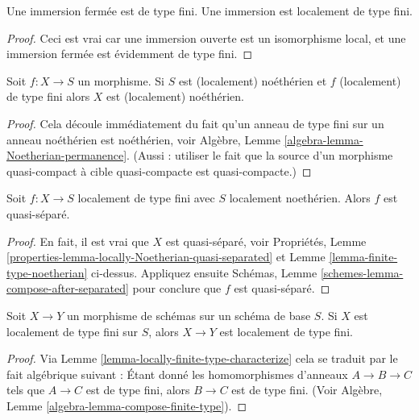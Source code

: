 \begin{lemma}
\label{lemma-immersion-locally-finite-type}
Une immersion fermée est de type fini. Une
immersion est localement de type fini.
\end{lemma}

\begin{proof}
Ceci est vrai car une immersion ouverte est un isomorphisme local,
et une immersion fermée est évidemment de type fini.
\end{proof}

\begin{lemma}
\label{lemma-finite-type-noetherian}
Soit $f : X \to S$ un morphisme. Si $S$
est (localement) noéthérien et $f$ (localement) de type fini alors
$X$ est (localement) noéthérien.
\end{lemma}

\begin{proof}
Cela découle immédiatement du fait qu'un anneau
de type fini sur un anneau noéthérien est noéthérien,
voir Algèbre, Lemme \ref{algebra-lemma-Noetherian-permanence}. (Aussi : utiliser
le fait que la source d'un morphisme quasi-compact à cible
quasi-compacte est quasi-compacte.)
\end{proof}

\begin{lemma}
\label{lemma-finite-type-Noetherian-quasi-separated}
Soit $f : X \to S$ localement de type fini avec $S$ localement noethérien. Alors
$f$ est quasi-séparé.
\end{lemma}

\begin{proof}
En fait, il est vrai que $X$ est
quasi-séparé, voir Propriétés, Lemme \ref{properties-lemma-locally-Noetherian-quasi-separated} et Lemme
\ref{lemma-finite-type-noetherian} ci-dessus. Appliquez ensuite
Schémas, Lemme \ref{schemes-lemma-compose-after-separated} pour conclure que
$f$ est quasi-séparé.
\end{proof}

\begin{lemma}
\label{lemma-permanence-finite-type}
Soit $X \to Y$ un morphisme de schémas sur un schéma de base $S$. Si
$X$ est localement de type fini sur $S$, alors $X \to Y$
est localement de type fini.
\end{lemma}

\begin{proof}
Via Lemme \ref{lemma-locally-finite-type-characterize} cela se traduit par le fait algébrique suivant
: Étant donné les
homomorphismes d'anneaux $A \to B \to C$ tels que $A \to C$
est de type fini, alors $B \to C$ est
de
type fini. (Voir Algèbre, Lemme \ref{algebra-lemma-compose-finite-type}).
\end{proof}







